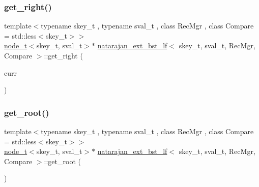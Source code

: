 \mbox{\label{classnatarajan__ext__bst__lf_ae8d692e12e9ddc4bb5f986b500ff96b4}} 
\subsubsection{\texorpdfstring{get\+\_\+right()}{get\_right()}\hspace{0.1cm}{\footnotesize\ttfamily [2/2]}}
{\footnotesize\ttfamily template$<$typename skey\+\_\+t , typename sval\+\_\+t , class Rec\+Mgr , class Compare  = std\+::less$<$skey\+\_\+t$>$$>$ \\
\hyperlink{structnode__t}{node\+\_\+t}$<$skey\+\_\+t, sval\+\_\+t$>$$\ast$ \hyperlink{classnatarajan__ext__bst__lf}{natarajan\+\_\+ext\+\_\+bst\+\_\+lf}$<$ skey\+\_\+t, sval\+\_\+t, Rec\+Mgr, Compare $>$\+::get\+\_\+right (\begin{DoxyParamCaption}\item[{\hyperlink{structnode__t}{node\+\_\+t}$<$ skey\+\_\+t, sval\+\_\+t $>$ $\ast$}]{curr }\end{DoxyParamCaption})\hspace{0.3cm}{\ttfamily [inline]}}

\mbox{\label{classnatarajan__ext__bst__lf_aa6b371791b726b19343e1a6c64d38f92}} 
\subsubsection{\texorpdfstring{get\+\_\+root()}{get\_root()}\hspace{0.1cm}{\footnotesize\ttfamily [1/2]}}
{\footnotesize\ttfamily template$<$typename skey\+\_\+t , typename sval\+\_\+t , class Rec\+Mgr , class Compare  = std\+::less$<$skey\+\_\+t$>$$>$ \\
\hyperlink{structnode__t}{node\+\_\+t}$<$skey\+\_\+t, sval\+\_\+t$>$$\ast$ \hyperlink{classnatarajan__ext__bst__lf}{natarajan\+\_\+ext\+\_\+bst\+\_\+lf}$<$ skey\+\_\+t, sval\+\_\+t, Rec\+Mgr, Compare $>$\+::get\+\_\+root (\begin{DoxyParamCaption}{ }\end{DoxyParamCaption})\hspace{0.3cm}{\ttfamily [inline]}}


